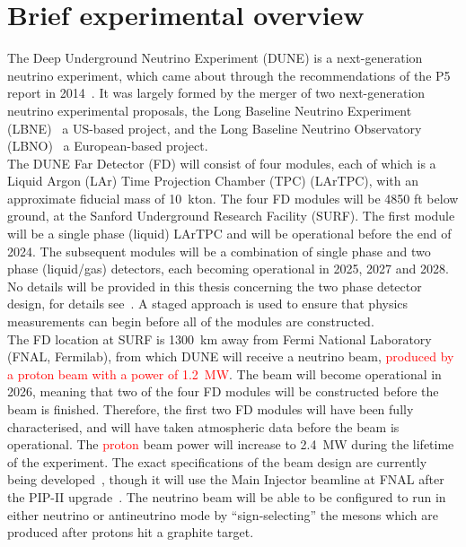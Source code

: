 \section{Brief experimental overview} \label{sec:DUNEOverview}
The Deep Underground Neutrino Experiment (DUNE) is a next-generation neutrino experiment, which came about through the recommendations of the P5 report in 2014~\citep{P5Doc}. It was largely formed by the merger of two next-generation neutrino experimental proposals, the Long Baseline Neutrino Experiment (LBNE)~\citep{LBNE_CDR1, LBNE_CDR2, LBNE_CDR3, LBNE_CDR4, LBNE_CDR5, LBNE_CDR6} a US-based project, and the Long Baseline Neutrino Observatory (LBNO)~\citep{LBNO_EOI} a European-based project. \\

The DUNE Far Detector (FD) will consist of four modules, each of which is a Liquid Argon (LAr) Time Projection Chamber (TPC) (LArTPC), with an approximate fiducial mass of 10~kton. The four FD modules will be 4850 ft below ground, at the Sanford Underground Research Facility (SURF). The first module will be a single phase (liquid) LArTPC and will be operational before the end of 2024. The subsequent modules will be a combination of single phase and two phase (liquid/gas) detectors, each becoming operational in 2025, 2027 and 2028. No details will be provided in this thesis concerning the two phase detector design, for details see~\citep{DUNECDR_V4}. A staged approach is used to ensure that physics measurements can begin before all of the modules are constructed. \\

The FD location at SURF is 1300~km away from Fermi National Laboratory (FNAL, Fermilab), from which DUNE will receive a neutrino beam, \textcolor{red}{produced by a proton beam with a power of 1.2~MW}. The beam will become operational in 2026, meaning that two of the four FD modules will be constructed before the beam is finished. Therefore, the first two FD modules will have been fully characterised, and will have taken atmospheric data before the beam is operational. The \textcolor{red}{proton} beam power will increase to 2.4~MW during the lifetime of the experiment. The exact specifications of the beam design are currently being developed~\citep{DUNECDR_V3}, though it will use the Main Injector beamline at FNAL after the PIP-II upgrade~\citep{PIP-II}. The neutrino beam will be able to be configured to run in either neutrino or antineutrino mode by ``sign-selecting'' the mesons which are produced after protons hit a graphite target. \\

